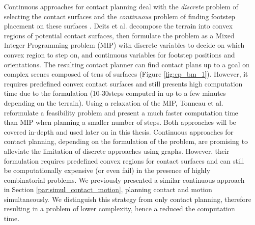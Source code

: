 Continuous approaches for contact planning deal with the \textit{discrete} problem of selecting the contact surfaces and the \textit{continuous} problem of finding footstep placement on these surfaces \cite{sl1m_v2}.
Deits et al. \cite{deits2014FootPlanMI} decompose the terrain into convex regions of potential contact surfaces, then formulate the problem as a Mixed Integer Programming problem (MIP) with discrete variables to decide on which convex region to step on, and continuous variables for footstep positions and orientations. 
The resulting contact planner can find contact plans up to a goal on complex scenes composed of tens of surfaces (Figure \ref{fig:cp_bm_1}). However, it requires predefined convex contact surfaces and still presents high computation time due to the formulation (10-30steps computed in up to a few minutes depending on the terrain).
Using a relaxation of the MIP, Tonneau et al. \cite{sl1m_v1} reformulate a feasibility problem and present a much faster computation time than MIP when planning a smaller number of steps.
Both approaches will be covered in-depth and used later on in this thesis.
Continuous approaches for contact planning, depending on the formulation of the problem, are promising to alleviate the limitation of discrete approaches using graphs.
However, their formulation requires predefined convex regions for contact surfaces and can still be computationally expensive (or even fail) in the presence of highly combinatorial problems.
We previously presented a similar continuous approach in Section \ref{par:simul_contact_motion}, planning contact and motion simultaneously.
We distinguish this strategy from only contact planning, therefore resulting in a problem of lower complexity, hence a reduced the computation time.
